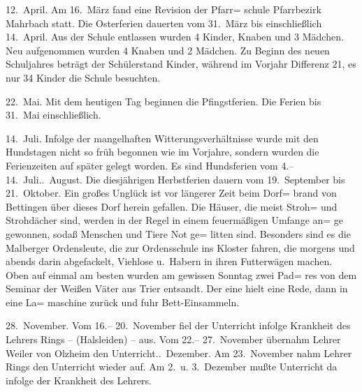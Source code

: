 

12.\ April.  Am 16.\ März fand eine Revision der Pfarr=\ob
schule Pfarrbezirk Mahrbach statt.\ob
Die Osterferien dauerten vom 31.\ März bis\ob
einschließlich 14.\ April.\ob
Aus der Schule entlassen wurden 4 Kinder, Knaben und 3 Mädchen. Neu aufgenommen\ob
wurden 4 Knaben und 2 Mädchen. Zu Beginn\ob
des neuen Schuljahres beträgt der Schülerstand Kinder, während im Vorjahr Differenz 21, es\ob
nur 34 Kinder die Schule besuchten.

22.\ Mai.    Mit dem heutigen Tag beginnen die Pfingstferien.\ob
Die Ferien bis 31.\ Mai einschließlich.

14.\ Juli.   Infolge der mangelhaften Witterungsverhältnisse wurde mit\ob
den Hundstagen nicht so früh begonnen wie im Vorjahre, sondern\ob
wurden die Ferienzeiten auf später gelegt worden. Es sind\ob
Hundsferien vom 4.– 14.\ Juli..\ August. Die diesjährigen Herbstferien dauern vom 19.\ September\ob
bis 21.\ Oktober.\ob
Ein großes Unglück ist vor längerer Zeit beim Dorf=\ob
brand von Bettingen über dieses Dorf herein gefallen.\ob
Die Häuser, die meist Stroh= und Strohdächer sind,\ob
werden in der Regel in einem feuermäßigen Umfange an=\ob
ge gewonnen, sodaß Menschen und Tiere Not ge=\ob
litten sind. Besonders sind es die Malberger Ordensleute,\ob
die zur Ordensschule ins Kloster fahren, die morgens\ob
und abends darin\unsicher{} abgefackelt, Viehlose u.\ Habern\unsicher\ob
in ihren Futterwägen machen. Oben\unsicher{} auf einmal\ob
am besten wurden am gewissen Sonntag zwei Pad=\ob
res von dem Seminar der Weißen Väter aus Trier\ob
entsandt. Der eine hielt eine Rede, dann in eine La=\ob
maschine zurück und fuhr Bett-Einsammeln\unsicher.

28.\ November.  Vom 16.– 20.\ November fiel der Unterricht infolge\ob
Krankheit des Lehrers Rings – (Halsleiden) – aus.\ob
Vom 22.– 27.\ November übernahm Lehrer Weiler\ob
von Olzheim den Unterricht..\ Dezember.  Am 23.\ November nahm Lehrer Rings den Unterricht\ob
wieder auf. Am 2.\ u. 3.\ Dezember mußte Unterricht da infolge\ob
der Krankheit des Lehrers\unsicher.
\pend
